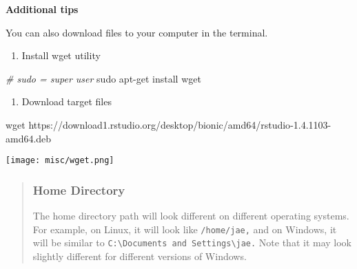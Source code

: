 \documentclass[
]{book}
\newenvironment{Shaded}{\begin{snugshade}}{\end{snugshade}}
\newcommand{\CommentTok}[1]{\textcolor[rgb]{0.56,0.35,0.01}{\textit{#1}}}
\newcommand{\FunctionTok}[1]{\textcolor[rgb]{0.00,0.00,0.00}{#1}}
\newcommand{\NormalTok}[1]{#1}
\providecommand{\tightlist}{%
  \setlength{\itemsep}{0pt}\setlength{\parskip}{0pt}}
\begin{document}
\textbf{Additional tips}

You can also download files to your computer in the terminal.

\begin{enumerate}
\def\labelenumi{\arabic{enumi}.}
\tightlist
\item
  Install wget utility
\end{enumerate}

\begin{Shaded}
\begin{Highlighting}[]
\CommentTok{\# sudo = super user }
\FunctionTok{sudo}\NormalTok{ apt{-}get install wget }
\end{Highlighting}
\end{Shaded}

\begin{enumerate}
\def\labelenumi{\arabic{enumi}.}
\setcounter{enumi}{1}
\tightlist
\item
  Download target files
\end{enumerate}

\begin{Shaded}
\begin{Highlighting}[]
\FunctionTok{wget}\NormalTok{ https://download1.rstudio.org/desktop/bionic/amd64/rstudio{-}1.4.1103{-}amd64.deb}
\end{Highlighting}
\end{Shaded}

\texttt{[image: misc/wget.png]}

\begin{quote}
\hypertarget{home-directory}{%
\subsubsection{Home Directory}\label{home-directory}}

The home directory path will look different on different operating systems. For example, on Linux, it will look like \texttt{/home/jae,} and on Windows, it will be similar to \texttt{C:\textbackslash{}Documents\ and\ Settings\textbackslash{}jae.} Note that it may look slightly different for different versions of Windows.
\end{quote}
\end{document}
